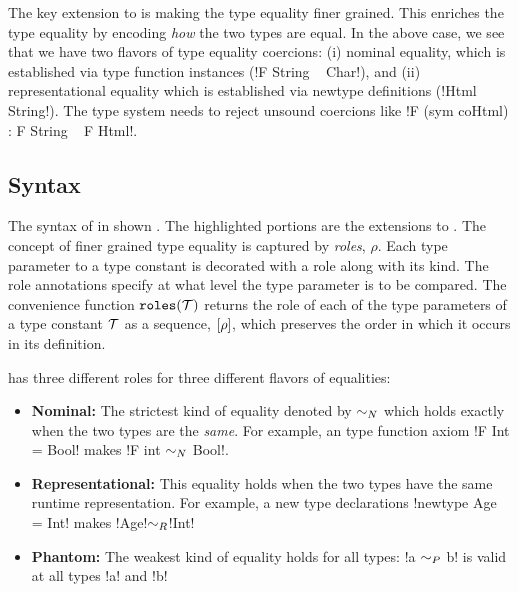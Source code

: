 \documentclass[screen,nonacm,manuscript,review]{acmart} %
\begin{document}
The key extension to \SFC
is making the type equality finer grained.
This enriches the type equality by encoding
\emph{how} the two types are equal. In the above case, we see that
we have two flavors of type equality coercions:
(i) nominal equality, which is established
via type function instances (!F String ~ Char!), and
(ii) representational equality which is established
via newtype definitions (!Html ~ String!). The type system
needs to reject unsound coercions like !F (sym coHtml) : F String ~ F Html!.

\subsection{Syntax}\label{sec:sfr-syntax}
The syntax of \SFR\cite{breitner_safe_2014, weirich_generative_2011} in shown .
The highlighted portions are the extensions to \SFC.
The concept of finer grained type equality is captured by \emph{roles}, $\rho$.
Each type parameter to a type constant is decorated with a role along
with its kind. The role annotations
specify at what level the type parameter is to be compared.
The convenience function $\texttt{roles}(\mathcal{T})$ returns the role of
each of the type parameters of a type constant $\mathcal{T}$ as a sequence, $[\rho]$, which
preserves the order in which it occurs in its definition.

\SFR has three different roles for three different flavors of equalities:
\begin{itemize}
\item\textbf{Nominal:} The strictest kind of equality denoted by
  $\mathrel{\sim_N}$ which holds exactly when the two types are the \emph{same}.
  For example, an type function axiom !F Int = Bool!
  makes !F int $\mathrel{\sim_N}$ Bool!.
\item\textbf{Representational:} This equality holds when the two types
  have the same runtime representation.
  For example, a new type declarations !newtype Age = Int! makes
  !Age!$\mathrel{\sim_R}$!Int!
\item\textbf{Phantom:} The weakest kind of equality holds for all
  types: !a $\mathrel{\sim_P}$ b! is valid at all types !a! and !b!
\end{itemize}
\end{document}

